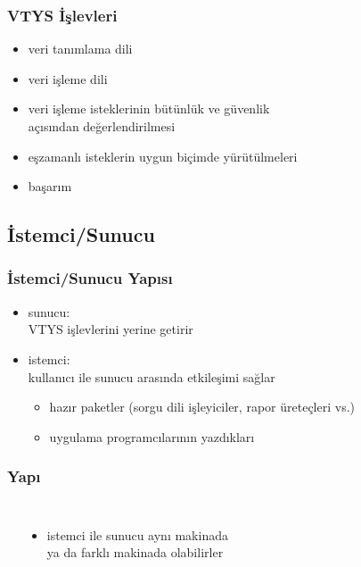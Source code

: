 \documentclass[dvipsnames]{beamer}
\theoremstyle{definition}
\theoremstyle{example}
\theoremstyle{plain}
\begin{document}
\begin{frame}
  \frametitle{VTYS İşlevleri}

  \begin{itemize}
    \item veri tanımlama dili

    \pause
    \item veri işleme dili

    \pause
    \item veri işleme isteklerinin bütünlük ve güvenlik\\
      açısından değerlendirilmesi

    \pause
    \item eşzamanlı isteklerin uygun biçimde yürütülmeleri

    \pause
    \item başarım
  \end{itemize}
\end{frame}

\subsection{İstemci/Sunucu}

\begin{frame}
  \frametitle{İstemci/Sunucu Yapısı}

  \begin{itemize}
    \item \alert{sunucu}:\\
      VTYS işlevlerini yerine getirir

    \pause
    \bigskip
    \item \alert{istemci}:\\
      kullanıcı ile sunucu arasında etkileşimi sağlar
    \begin{itemize}
      \item hazır paketler (sorgu dili işleyiciler, rapor üreteçleri vs.)
      \item uygulama programcılarının yazdıkları
    \end{itemize}
  \end{itemize}
\end{frame}

\begin{frame}
  \frametitle{Yapı}

  \begin{columns}
    \begin{center}
    \end{center}

    \begin{itemize}
      \item istemci ile sunucu aynı makinada\\
	ya da farklı makinada olabilirler
    \end{itemize}
  \end{columns}
\end{frame}
\end{document}
